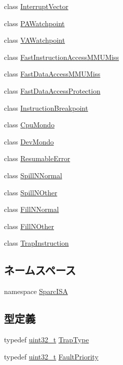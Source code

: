 \begin{DoxyCompactItemize}
\item 
class \hyperlink{classSparcISA_1_1InterruptVector}{InterruptVector}
\item 
class \hyperlink{classSparcISA_1_1PAWatchpoint}{PAWatchpoint}
\item 
class \hyperlink{classSparcISA_1_1VAWatchpoint}{VAWatchpoint}
\item 
class \hyperlink{classSparcISA_1_1FastInstructionAccessMMUMiss}{FastInstructionAccessMMUMiss}
\item 
class \hyperlink{classSparcISA_1_1FastDataAccessMMUMiss}{FastDataAccessMMUMiss}
\item 
class \hyperlink{classSparcISA_1_1FastDataAccessProtection}{FastDataAccessProtection}
\item 
class \hyperlink{classSparcISA_1_1InstructionBreakpoint}{InstructionBreakpoint}
\item 
class \hyperlink{classSparcISA_1_1CpuMondo}{CpuMondo}
\item 
class \hyperlink{classSparcISA_1_1DevMondo}{DevMondo}
\item 
class \hyperlink{classSparcISA_1_1ResumableError}{ResumableError}
\item 
class \hyperlink{classSparcISA_1_1SpillNNormal}{SpillNNormal}
\item 
class \hyperlink{classSparcISA_1_1SpillNOther}{SpillNOther}
\item 
class \hyperlink{classSparcISA_1_1FillNNormal}{FillNNormal}
\item 
class \hyperlink{classSparcISA_1_1FillNOther}{FillNOther}
\item 
class \hyperlink{classSparcISA_1_1TrapInstruction}{TrapInstruction}
\end{DoxyCompactItemize}
\subsection*{ネームスペース}
\begin{DoxyCompactItemize}
\item 
namespace \hyperlink{namespaceSparcISA}{SparcISA}
\end{DoxyCompactItemize}
\subsection*{型定義}
\begin{DoxyCompactItemize}
\item 
typedef \hyperlink{Type_8hh_a435d1572bf3f880d55459d9805097f62}{uint32\_\-t} \hyperlink{namespaceSparcISA_aabeb6cc11127ef5b6ebc776bfc5fb95b}{TrapType}
\item 
typedef \hyperlink{Type_8hh_a435d1572bf3f880d55459d9805097f62}{uint32\_\-t} \hyperlink{namespaceSparcISA_ab4ef46911de05ddf45ea58ee440ff324}{FaultPriority}
\end{DoxyCompactItemize}
